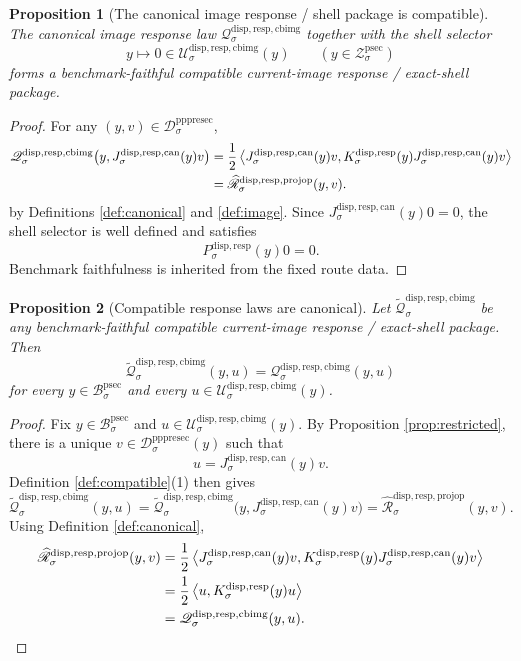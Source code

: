 \documentclass[11pt]{article}
\newcommand{\ProtoSectionBody}[1]{\mathcal B_{#1}^{\mathrm{psec}}}
\newcommand{\ProtoSectionShell}[1]{\mathcal Z_{#1}^{\mathrm{psec}}}
\newcommand{\PrePreProtoSectionResidualBody}[1]{\mathcal D_{#1}^{\mathrm{pppresec}}}
\newcommand{\SubstrateProjection}[1]{P_{#1}^{\mathrm{disp,resp}}}
\newcommand{\SubstrateOperator}[1]{K_{#1}^{\mathrm{disp,resp}}}
\newcommand{\CanonicalLift}[1]{J_{#1}^{\mathrm{disp,resp,can}}}
\newcommand{\CoreForcedBodyResponse}[1]{\widehat{\mathscr R}_{#1}^{\mathrm{disp,resp,projop}}}
\newcommand{\CanonicalImageBody}[1]{\mathcal U_{#1}^{\mathrm{disp,resp,cbimg}}}
\newcommand{\CanonicalImageResponseLaw}[1]{\mathscr Q_{#1}^{\mathrm{disp,resp,cbimg}}}
\newcommand{\CompatibleImageResponseLaw}[1]{\widetilde{\mathscr Q}_{#1}^{\mathrm{disp,resp,cbimg}}}
\newtheorem{proposition}{Proposition}
\begin{document}
\begin{proposition}[The canonical image response / shell package is compatible]
\label{prop:exists}
The canonical image response law \(\CanonicalImageResponseLaw{\sigma}\) together with the shell selector
\[
y\longmapsto 0\in\CanonicalImageBody{\sigma}(y)
\qquad
(y\in\ProtoSectionShell{\sigma})
\]
forms a benchmark-faithful compatible current-image response / exact-shell package.
\end{proposition}

\begin{proof}
For any \((y,v)\in\PrePreProtoSectionResidualBody{\sigma}\),
\begin{align*}
\CanonicalImageResponseLaw{\sigma}\bigl(y,\CanonicalLift{\sigma}(y)v\bigr)
&=
\frac{1}{2}
\ev{
\CanonicalLift{\sigma}(y)v,
\SubstrateOperator{\sigma}(y)\CanonicalLift{\sigma}(y)v
} \\
&=
\CoreForcedBodyResponse{\sigma}(y,v).
\end{align*}
by Definitions \ref{def:canonical} and \ref{def:image}. Since \(\CanonicalLift{\sigma}(y)0=0\), the shell selector is well defined and satisfies
\[
\SubstrateProjection{\sigma}(y)0=0.
\]
Benchmark faithfulness is inherited from the fixed route data.
\end{proof}

\begin{proposition}[Compatible response laws are canonical]
\label{prop:response}
Let \(\CompatibleImageResponseLaw{\sigma}\) be any benchmark-faithful compatible current-image response / exact-shell package. Then
\[
\CompatibleImageResponseLaw{\sigma}(y,u)
=
\CanonicalImageResponseLaw{\sigma}(y,u)
\]
for every \(y\in\ProtoSectionBody{\sigma}\) and every \(u\in\CanonicalImageBody{\sigma}(y)\).
\end{proposition}

\begin{proof}
Fix \(y\in\ProtoSectionBody{\sigma}\) and \(u\in\CanonicalImageBody{\sigma}(y)\). By Proposition \ref{prop:restricted}, there is a unique \(v\in\PrePreProtoSectionResidualBody{\sigma}(y)\) such that
\[
u=\CanonicalLift{\sigma}(y)v.
\]
Definition \ref{def:compatible}(1) then gives
\[
\CompatibleImageResponseLaw{\sigma}(y,u)
=
\CompatibleImageResponseLaw{\sigma}\bigl(y,\CanonicalLift{\sigma}(y)v\bigr)
=
\CoreForcedBodyResponse{\sigma}(y,v).
\]
Using Definition \ref{def:canonical},
\begin{align*}
\CoreForcedBodyResponse{\sigma}(y,v)
&=
\frac{1}{2}
\ev{
\CanonicalLift{\sigma}(y)v,
\SubstrateOperator{\sigma}(y)\CanonicalLift{\sigma}(y)v
} \\
&=
\frac{1}{2}
\ev{u,\SubstrateOperator{\sigma}(y)u} \\
&=
\CanonicalImageResponseLaw{\sigma}(y,u).
\end{align*}
\end{proof}
\end{document}
